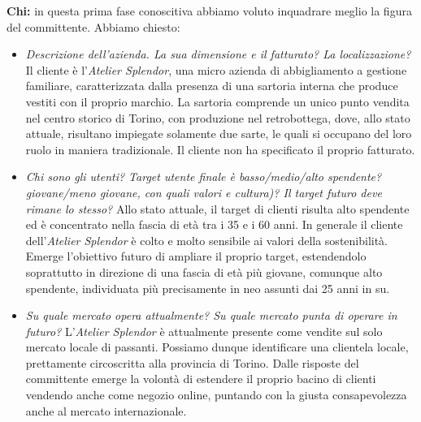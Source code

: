 \documentclass[12pt]{article}
\begin{document}
\textbf{Chi:} in questa prima fase conoscitiva abbiamo voluto inquadrare meglio la figura del committente. Abbiamo chiesto:
\begin{itemize}
    \item {\em Descrizione dell'azienda. La sua dimensione e il fatturato? La localizzazione?} Il cliente è l'{\em Atelier Splendor}, una micro azienda di abbigliamento a gestione familiare, caratterizzata dalla presenza di una sartoria interna che produce vestiti con il proprio marchio. La sartoria comprende un unico punto vendita nel centro storico di Torino, con produzione nel retrobottega, dove, allo stato attuale, risultano impiegate solamente due sarte, le quali si occupano del loro ruolo in maniera tradizionale.
    Il cliente non ha specificato il proprio fatturato.
    \item {\em Chi sono gli utenti? Target utente finale è basso/medio/alto spendente? giovane/meno giovane, con quali valori e cultura)? Il target futuro deve rimane lo stesso?} Allo stato attuale, il target di clienti risulta alto spendente ed è concentrato nella fascia di età tra i 35 e i 60 anni. In generale il cliente dell'{\em Atelier Splendor} è colto e molto sensibile ai valori della sostenibilità. Emerge l'obiettivo futuro di ampliare il proprio target, estendendolo soprattutto in direzione di una fascia di età più giovane, comunque alto spendente, individuata più precisamente in neo assunti dai 25 anni in su.  
    \item {\em Su quale mercato opera attualmente? Su quale mercato punta di operare in futuro?} L'{\em Atelier Splendor} è attualmente presente come vendite sul solo mercato locale di passanti. Possiamo dunque identificare una clientela locale, prettamente circoscritta alla provincia di Torino. Dalle risposte del committente emerge la volontà di estendere il proprio bacino di clienti vendendo anche come negozio online, puntando con la giusta consapevolezza anche al mercato internazionale.
\end{itemize}
\end{document}
